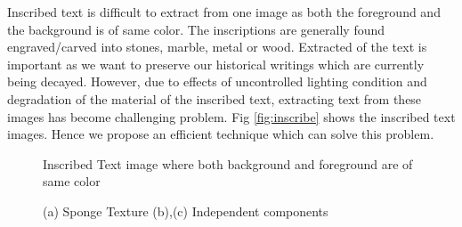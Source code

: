 Inscribed text is difficult to extract from one image as both the foreground and the background is of same 
color.
The inscriptions are generally found engraved/carved into stones, marble, metal or wood.
Extracted of the text is important as we want to preserve our historical writings which are currently being decayed.
However, due to effects of uncontrolled lighting condition and degradation of the material of the inscribed text,
extracting text from these images has become challenging problem. Fig \ref{fig:inscribe} shows the inscribed text images.
Hence we propose an efficient technique which can solve this problem.
\begin{figure}[t]
\centering
{}
\label{fig:subfig11}
\caption
{Inscribed Text image where both background and foreground are of same color}
\label{fig:inscribe}
\centering
{}
\label{fig:subfig11}
\caption
{(a) Sponge Texture (b),(c) Independent components}
\label{fig:IC}
\end{figure}
